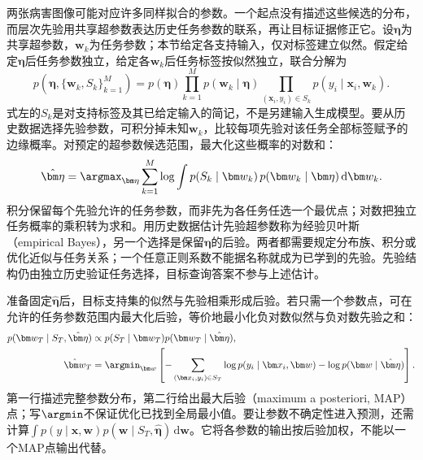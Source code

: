 两张病害图像可能对应许多同样拟合的参数。一个起点没有描述这些候选的分布，而层次先验用共享超参数表达历史任务参数的联系，再让目标证据修正它。设$\bm\eta$为共享超参数，$\bm w_k$为任务参数；本节给定各支持输入，仅对标签建立似然。假定给定$\bm\eta$后任务参数独立，给定各$\bm w_k$后任务标签按似然独立，联合分解为
\begin{equation}
  p(\bm\eta,\{\bm w_k,S_k\}_{k=1}^{M})
   =p(\bm\eta)\prod_{k=1}^{M}
      p(\bm w_k\mid\bm\eta)
      \prod_{(\bm x_i,y_i)\in S_k}
      p(y_i\mid\bm x_i,\bm w_k).
  \label{eq:ket-transfer-hierarchical-model}
\end{equation}
式左的$S_k$是对支持标签及其已给定输入的简记，不是另建输入生成模型。要从历史数据选择先验参数，可积分掉未知$\bm w_k$，比较每项先验对该任务全部标签赋予的边缘概率。对预定的超参数候选范围，最大化这些概率的对数和：
\begin{equation}
  \hat{\bm\eta}
  =\argmax_{\bm\eta}\sum_{k=1}^{M}
     \log\int p(S_k\mid\bm w_k)\,
          p(\bm w_k\mid\bm\eta)\,\mathrm d\bm w_k.
  \label{eq:ket-transfer-empirical-bayes}
\end{equation}
积分保留每个先验允许的任务参数，而非先为各任务任选一个最优点；对数把独立任务概率的乘积转为求和。用历史数据估计先验超参数称为经验贝叶斯（empirical Bayes），另一个选择是保留$\bm\eta$的后验。两者都需要规定分布族、积分或优化近似与任务关系；一个任意正则系数不能据名称就成为已学到的先验。先验结构仍由独立历史验证任务选择，目标查询答案不参与上述估计。

准备固定$\hat{\bm\eta}$后，目标支持集的似然与先验相乘形成后验。若只需一个参数点，可在允许的任务参数范围内最大化后验，等价地最小化负对数似然与负对数先验之和：
\begin{align}
  p(\bm w_T\mid S_T,\hat{\bm\eta})
  &\propto p(S_T\mid\bm w_T)p(\bm w_T\mid\hat{\bm\eta}), \nonumber\\
  \hat{\bm w}_T
  &=\argmin_{\bm w}\left[
       -\sum_{(\bm x_i,y_i)\in S_T}\log p(y_i\mid\bm x_i,\bm w)
       -\log p(\bm w\mid\hat{\bm\eta})\right].
  \label{eq:ket-transfer-map}
\end{align}
第一行描述完整参数分布，第二行给出最大后验（maximum a posteriori, MAP）点；写$\argmin$不保证优化已找到全局最小值。要让参数不确定性进入预测，还需计算$\int p(y\mid\bm x,\bm w)p(\bm w\mid S_T,\hat{\bm\eta})\,\mathrm d\bm w$。它将各参数的输出按后验加权，不能以一个MAP点输出代替。

